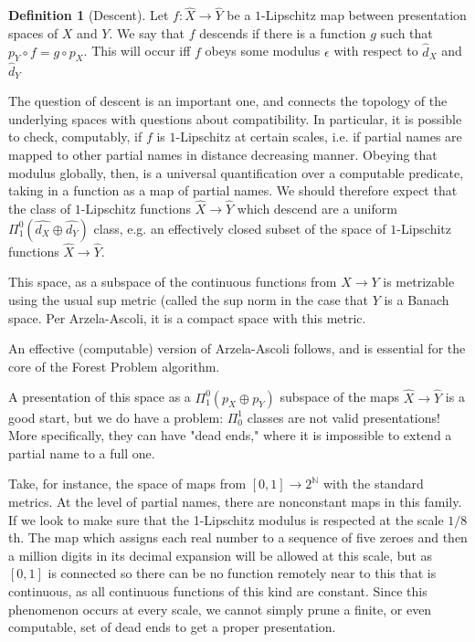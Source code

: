 \documentclass[10pt,a4paper]{article}
\theoremstyle{definition}
\newtheorem{dfn}[thm]{Definition}
\newcommand{\N}{\mathbb{N}}
\begin{document}
\begin{dfn}[Descent]
Let $f:\hat{X}\rightarrow \hat{Y}$ be a $1$-Lipschitz map between presentation spaces of $X$ and $Y$. We say that $f$ descends if there is a function $g$ such that $p_Y\circ f = g\circ p_X$. This will occur iff $f$ obeys some modulus $\epsilon$ with respect to $\hat{d}_X$ and $\hat{d}_Y$
\end{dfn}
\label{dfn:descentfunc}
The question of descent is an important one, and connects the topology of the underlying spaces with questions about compatibility. In particular, it is possible to check, computably, if $f$ is $1$-Lipschitz at certain scales, i.e. if partial names are mapped to other partial names in distance decreasing manner. Obeying that modulus globally, then, is a universal quantification over a computable predicate, taking in a function as a map of partial names. We should therefore expect that the class of $1$-Lipschitz functions $\hat{X}\rightarrow \hat{Y}$ which descend are a uniform $\Pi^0_1(\hat{d_X}\oplus \hat{d_Y})$ class, e.g. an effectively closed subset of the space of $1$-Lipschitz functions $\hat{X}\rightarrow \hat{Y}$.

This space, as a subspace of the continuous functions from $X\rightarrow Y$ is metrizable using the usual sup metric (called the sup norm in the case that $Y$ is a Banach space. Per Arzela-Ascoli, it is a compact space with this metric.

An effective (computable) version of Arzela-Ascoli follows, and is essential for the core of the Forest Problem algorithm.

A presentation of this space as a $\Pi^0_1(p_X\oplus p_Y)$ subspace of the maps $\hat{X}\rightarrow \hat{Y}$ is a good start, but we do have a problem: $\Pi_0^1$ classes are not valid presentations! More specifically, they can have "dead ends," where it is impossible to extend a partial name to a full one. 

Take, for instance, the space of maps from $[0,1]\rightarrow 2^\N$ with the standard metrics. At the level of partial names, there are nonconstant maps in this family. If we look to make sure that the 1-Lipschitz modulus is respected at the scale $1/8$th. The map which assigns each real number to a sequence of five zeroes and then a million digits in its decimal expansion will be allowed at this scale, but as $[0,1]$ is connected so there can be no function remotely near to this that is continuous, as all continuous functions of this kind are constant. Since this phenomenon occurs at every scale, we cannot simply prune a finite, or even computable, set of dead ends to get a proper presentation.
\end{document}
